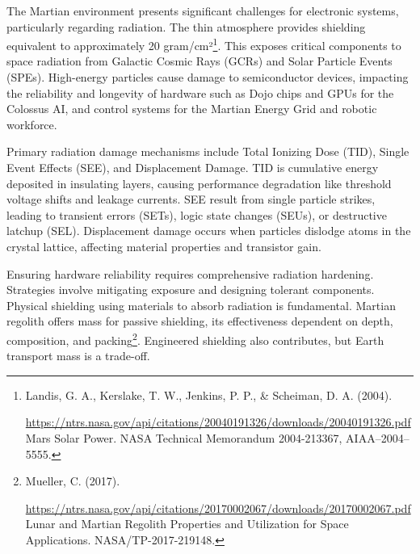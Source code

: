 \documentclass[fontsize=10pt, oneside, DIV=calc]{scrartcl}
\begin{document}


\medskip

\noindent
The Martian environment presents significant challenges for electronic systems, particularly regarding radiation. The thin atmosphere provides shielding equivalent to approximately 20 gram/cm²\footnote{Landis, G. A., Kerslake, T. W., Jenkins, P. P., \& Scheiman, D. A. (2004). 







\href{https://ntrs.nasa.gov/api/citations/20040191326/downloads/20040191326.pdf}\url{https://ntrs.nasa.gov/api/citations/20040191326/downloads/20040191326.pdf} Mars Solar Power. NASA Technical Memorandum 2004-213367, AIAA–2004–5555.}. This exposes critical components to space radiation from Galactic Cosmic Rays (GCRs) and Solar Particle Events (SPEs). High-energy particles cause damage to semiconductor devices, impacting the reliability and longevity of hardware such as Dojo chips and GPUs for the Colossus AI, and control systems for the Martian Energy Grid and robotic workforce.

\medskip

\noindent
Primary radiation damage mechanisms include Total Ionizing Dose (TID), Single Event Effects (SEE), and Displacement Damage. TID is cumulative energy deposited in insulating layers, causing performance degradation like threshold voltage shifts and leakage currents. SEE result from single particle strikes, leading to transient errors (SETs), logic state changes (SEUs), or destructive latchup (SEL). Displacement damage occurs when particles dislodge atoms in the crystal lattice, affecting material properties and transistor gain.

\medskip

\noindent
Ensuring hardware reliability requires comprehensive radiation hardening. Strategies involve mitigating exposure and designing tolerant components. Physical shielding using materials to absorb radiation is fundamental. Martian regolith offers mass for passive shielding, its effectiveness dependent on depth, composition, and packing\footnote{Mueller, C. (2017). 







\href{https://ntrs.nasa.gov/api/citations/20170002067/downloads/20170002067.pdf}\url{https://ntrs.nasa.gov/api/citations/20170002067/downloads/20170002067.pdf} Lunar and Martian Regolith Properties and Utilization for Space Applications. NASA/TP-2017-219148.}. Engineered shielding also contributes, but Earth transport mass is a trade-off.
\end{document}
